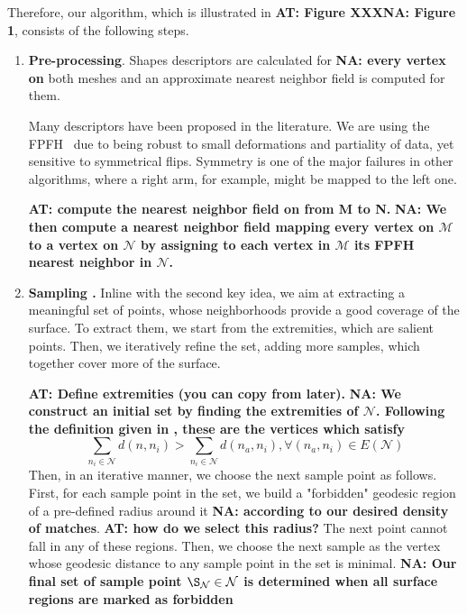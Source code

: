 \documentclass[10pt,twocolumn,letterpaper]{article}
\newcommand{\colornote}[3]{{\color{#1}\bf{#2: #3}\normalfont}}
\newcommand{\colornote}[3]{}
\newcommand {\ayellet}[1]{\colornote{blue}{AT}{#1}}
\newcommand {\nadav}[1]{\colornote{red}{NA}{#1}}
\begin{document}
Therefore, our algorithm, which is illustrated in \ayellet{Figure XXX}\nadav{Figure 1}, consists of the following steps.
\begin{enumerate}
    \item 
    \textbf{Pre-processing}.
    Shapes descriptors are calculated for \nadav{every vertex on} both meshes and an approximate nearest neighbor field is computed for them.
    
    Many descriptors have been proposed in the literature\cite{rusu2008towards,tombari2010unique,Sun:2009:CPI:1735603.1735621}.
    We are using the FPFH~\cite{rusu2009fast}  due to being robust to small deformations and partiality of data, yet sensitive to symmetrical flips.
    Symmetry is one of the major failures in other algorithms, where a right arm, for example, might be mapped to the left one.
    
    \ayellet{compute the nearest neighbor field on from  M to N.}
    \nadav{We then compute a nearest neighbor field mapping every vertex on $\mathcal{M}$ to a vertex on $\mathcal{N}$ by assigning to each vertex in $\mathcal{M}$ its FPFH nearest neighbor in $\mathcal{N}$.}
    \item
    {\bf Sampling .} 
    Inline with the second key idea, we aim at extracting a meaningful set of points, whose neighborhoods provide a good coverage of the surface. 
    To extract them, we start from the extremities, which are salient points.
    Then, we iteratively refine the set, adding more samples, which together cover more of the surface.
    
    \ayellet{Define extremities (you can copy from later).}
    \nadav{We construct an initial set by finding the extremities of $\mathcal{N}$. Following the definition given in \cite{katz2005mesh}, these are the vertices which satisfy
    \begin{equation}
        \sum_{n_i\in \mathcal{N}}d(n,n_i)>\sum_{n_i\in \mathcal{N}}d(n_a,n_i), \forall (n_a,n_i)\in E(\mathcal{N})
    \end{equation}
    }
    Then, in an iterative manner, we choose the next sample point as follows.
    First, for each sample point in the set, we build a "forbidden" geodesic region of a pre-defined radius around it \nadav{according to our desired density of matches}. \ayellet{how do we select this radius?}
    The next point cannot fall in any of these regions.
    Then, we choose the next sample as the vertex whose geodesic distance to any sample point in the set is minimal. \nadav{Our final set of sample point $\S_{\mathcal{N}}\in\mathcal{N}$ is determined when all surface regions are marked as forbidden}


\end{enumerate}
\end{document}
